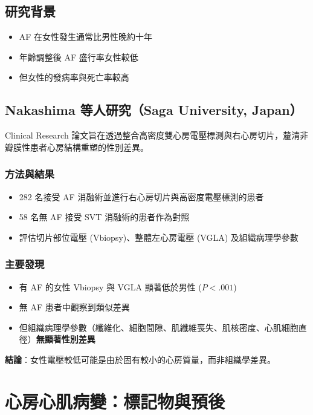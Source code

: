 \documentclass[12pt,a4paper]{article}
\begin{document}
\subsection{研究背景}

\begin{itemize}
    \item AF 在女性發生通常比男性晚約十年
    \item 年齡調整後 AF 盛行率女性較低
    \item 但女性的發病率與死亡率較高
\end{itemize}

\subsection{Nakashima 等人研究（Saga University, Japan）}

Clinical Research 論文旨在透過整合高密度雙心房電壓標測與右心房切片，釐清非瓣膜性患者心房結構重塑的性別差異。

\subsubsection{方法與結果}
\begin{itemize}
    \item 282 名接受 AF 消融術並進行右心房切片與高密度電壓標測的患者
    \item 58 名無 AF 接受 SVT 消融術的患者作為對照
    \item 評估切片部位電壓 (Vbiopsy)、整體左心房電壓 (VGLA) 及組織病理學參數
\end{itemize}

\subsubsection{主要發現}
\begin{itemize}
    \item 有 AF 的女性 Vbiopsy 與 VGLA 顯著低於男性 ($P < .001$)
    \item 無 AF 患者中觀察到類似差異
    \item 但組織病理學參數（纖維化、細胞間隙、肌纖維喪失、肌核密度、心肌細胞直徑）\textbf{無顯著性別差異}
\end{itemize}

\textbf{結論}：女性電壓較低可能是由於固有較小的心房質量，而非組織學差異。

\section{心房心肌病變：標記物與預後}
\end{document}
